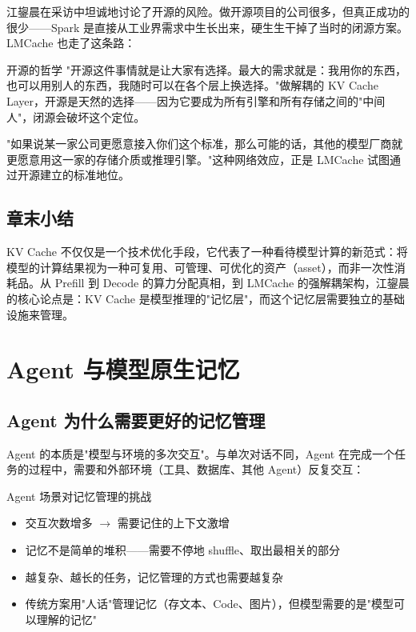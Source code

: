 \documentclass[a4paper]{article}
\begin{document}
江鋆晨在采访中坦诚地讨论了开源的风险。做开源项目的公司很多，但真正成功的很少——Spark 是直接从工业界需求中生长出来，硬生生干掉了当时的闭源方案。LMCache 也走了这条路：

\begin{knowledgebox}{开源的哲学}
"开源这件事情就是让大家有选择。最大的需求就是：我用你的东西，也可以用别人的东西，我随时可以在各个层上换选择。"做解耦的 KV Cache Layer，开源是天然的选择——因为它要成为所有引擎和所有存储之间的"中间人"，闭源会破坏这个定位。

"如果说某一家公司更愿意接入你们这个标准，那么可能的话，其他的模型厂商就更愿意用这一家的存储介质或推理引擎。"这种网络效应，正是 LMCache 试图通过开源建立的标准地位。
\end{knowledgebox}

\subsection{章末小结}

KV Cache 不仅仅是一个技术优化手段，它代表了一种看待模型计算的新范式：将模型的计算结果视为一种可复用、可管理、可优化的资产（asset），而非一次性消耗品。从 Prefill 到 Decode 的算力分配真相，到 LMCache 的强解耦架构，江鋆晨的核心论点是：KV Cache 是模型推理的"记忆层"，而这个记忆层需要独立的基础设施来管理。


\section{Agent 与模型原生记忆}

\subsection{Agent 为什么需要更好的记忆管理}

Agent 的本质是"模型与环境的多次交互"。与单次对话不同，Agent 在完成一个任务的过程中，需要和外部环境（工具、数据库、其他 Agent）反复交互：

\begin{importantbox}{Agent 场景对记忆管理的挑战}
\begin{itemize}
\item 交互次数增多 $\rightarrow$ 需要记住的上下文激增
\item 记忆不是简单的堆积——需要不停地 shuffle、取出最相关的部分
\item 越复杂、越长的任务，记忆管理的方式也需要越复杂
\item 传统方案用"人话"管理记忆（存文本、Code、图片），但模型需要的是"模型可以理解的记忆"
\end{itemize}
\end{importantbox}
\end{document}
